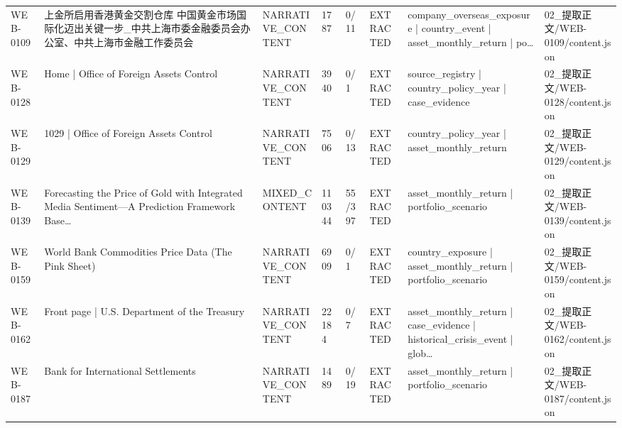 \begin{landscape}
\begin{longtable}{p{1.8cm}p{4.2cm}p{3.0cm}p{1.4cm}p{1.6cm}p{2.4cm}p{4.2cm}p{4.2cm}}
WEB-0109 & 上金所启用香港黄金交割仓库 中国黄金市场国际化迈出关键一步\_\allowbreak{}中共上海市委金融委员会办公室、中共上海市金融工作委员会 & NARRATIVE\_\allowbreak{}CONTENT & 1787 & 0/\allowbreak{}11 & EXTRACTED & company\_\allowbreak{}overseas\_\allowbreak{}exposure | country\_\allowbreak{}event | asset\_\allowbreak{}monthly\_\allowbreak{}return | po… & 02\_\allowbreak{}提取正文/\allowbreak{}WEB-0109/\allowbreak{}content.json\\
WEB-0128 & Home | Office of Foreign Assets Control & NARRATIVE\_\allowbreak{}CONTENT & 3940 & 0/\allowbreak{}1 & EXTRACTED & source\_\allowbreak{}registry | country\_\allowbreak{}policy\_\allowbreak{}year | case\_\allowbreak{}evidence & 02\_\allowbreak{}提取正文/\allowbreak{}WEB-0128/\allowbreak{}content.json\\
WEB-0129 & 1029 | Office of Foreign Assets Control & NARRATIVE\_\allowbreak{}CONTENT & 7506 & 0/\allowbreak{}13 & EXTRACTED & country\_\allowbreak{}policy\_\allowbreak{}year | asset\_\allowbreak{}monthly\_\allowbreak{}return & 02\_\allowbreak{}提取正文/\allowbreak{}WEB-0129/\allowbreak{}content.json\\
WEB-0139 & Forecasting the Price of Gold with Integrated Media Sentiment—A Prediction Framework Base… & MIXED\_\allowbreak{}CONTENT & 110344 & 55/\allowbreak{}397 & EXTRACTED & asset\_\allowbreak{}monthly\_\allowbreak{}return | portfolio\_\allowbreak{}scenario & 02\_\allowbreak{}提取正文/\allowbreak{}WEB-0139/\allowbreak{}content.json\\
WEB-0159 & World Bank Commodities Price Data (The Pink Sheet) & NARRATIVE\_\allowbreak{}CONTENT & 6909 & 0/\allowbreak{}1 & EXTRACTED & country\_\allowbreak{}exposure | asset\_\allowbreak{}monthly\_\allowbreak{}return | portfolio\_\allowbreak{}scenario & 02\_\allowbreak{}提取正文/\allowbreak{}WEB-0159/\allowbreak{}content.json\\
WEB-0162 & Front page | U.S. Department of the Treasury & NARRATIVE\_\allowbreak{}CONTENT & 22184 & 0/\allowbreak{}7 & EXTRACTED & asset\_\allowbreak{}monthly\_\allowbreak{}return | case\_\allowbreak{}evidence | historical\_\allowbreak{}crisis\_\allowbreak{}event | glob… & 02\_\allowbreak{}提取正文/\allowbreak{}WEB-0162/\allowbreak{}content.json\\
WEB-0187 & Bank for International Settlements & NARRATIVE\_\allowbreak{}CONTENT & 1489 & 0/\allowbreak{}19 & EXTRACTED & asset\_\allowbreak{}monthly\_\allowbreak{}return | portfolio\_\allowbreak{}scenario & 02\_\allowbreak{}提取正文/\allowbreak{}WEB-0187/\allowbreak{}content.json\\

\end{longtable}
\end{landscape}
